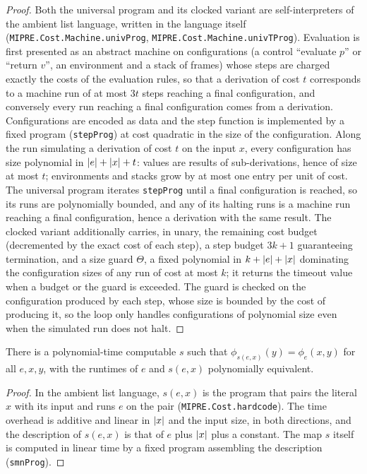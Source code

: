 \begin{proof}
\leanok
Both the universal program and its clocked variant are self-interpreters of the ambient
list language, written in the language itself (\texttt{MIPRE.Cost.Machine.univProg},
\texttt{MIPRE.Cost.Machine.univTProg}). Evaluation is first presented as an abstract
machine on configurations (a control ``evaluate $p$'' or ``return $v$'', an environment
and a stack of frames) whose steps are charged exactly the costs of the evaluation rules,
so that a derivation of cost $t$ corresponds to a machine run of at most $3t$ steps
reaching a final configuration, and conversely every run reaching a final configuration
comes from a derivation. Configurations are encoded as data and the step function is
implemented by a fixed program (\texttt{stepProg}) at cost quadratic in the size of the
configuration. Along the run simulating a derivation of cost $t$ on the input $x$, every
configuration has size polynomial in $\left\vert {e} \right\vert + \left\vert {x} \right\vert + t$: values are results of
sub-derivations, hence of size at most $t$; environments and stacks grow by at most one
entry per unit of cost. The universal program iterates \texttt{stepProg} until a final
configuration is reached, so its runs are polynomially bounded, and any of its halting
runs is a machine run reaching a final configuration, hence a derivation with the same
result. The clocked variant additionally carries, in unary, the remaining cost budget
(decremented by the exact cost of each step), a step budget $3k+1$ guaranteeing
termination, and a size guard $\Theta$, a fixed polynomial in $k + \left\vert {e} \right\vert + \left\vert {x} \right\vert$
dominating the configuration sizes of any run of cost at most $k$; it returns the timeout
value when a budget or the guard is exceeded. The guard is checked on the configuration
produced by each step, whose size is bounded by the cost of producing it, so the loop
only handles configurations of polynomial size even when the simulated run does not halt.
\end{proof}

\begin{lemma}[Efficient s-m-n]
\label{lem:smn}
\leanok
There is a polynomial-time computable $s$ such that $\phi_{s(e,x)}(y) = \phi_e(x, y)$
for all $e, x, y$, with the runtimes of $e$ and $s(e,x)$ polynomially equivalent.
\end{lemma}

\begin{proof}
\leanok
In the ambient list language, $s(e, x)$ is the program that pairs the literal $x$ with
its input and runs $e$ on the pair (\texttt{MIPRE.Cost.hardcode}). The time overhead is
additive and linear in $\left\vert {x} \right\vert$ and the input size, in both directions, and the
description of $s(e, x)$ is that of $e$ plus $\left\vert {x} \right\vert$ plus a constant. The map $s$
itself is computed in linear time by a fixed program assembling the description
(\texttt{smnProg}).
\end{proof}

